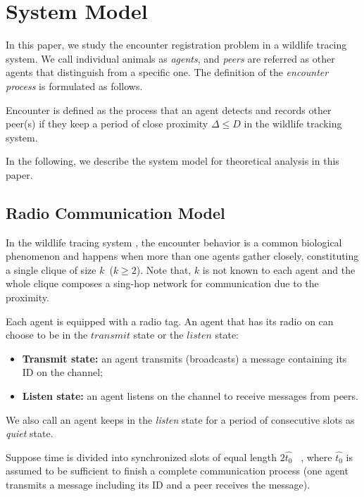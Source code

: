 \section{System Model}
\label{sectionmodel}

In this paper, we study the encounter registration problem in a wildlife 
tracing system. We call individual animals as \emph{agents}, 
and \emph{peers} are referred as other agents that distinguish from 
a specific one.
The definition of the \emph{encounter process} is formulated as follows.
\begin{definition}
Encounter is defined as the process that 
an agent detects and records other peer(s) if they keep a period of 
close proximity $\Delta \leq D$
in the wildlife tracking system. 
\end{definition}

In the following, we describe the system model for theoretical analysis in this paper.



\subsection{Radio Communication Model}


In the  wildlife tracing system {\sysname}, the encounter behavior  
is a common biological phenomenon and
happens when more than one agents gather closely, constituting a 
single clique of size $k$~($k \geq 2$).
Note that, $k$ is not known to each agent and the whole 
clique composes a sing-hop network for communication due to the proximity. 

Each agent is equipped with a radio tag. 
An agent that has its radio on can choose to be in the $transmit$ state
or the $listen$ state:
\begin{itemize}
\item \textbf{Transmit state:} an agent transmits (broadcasts) 
a message containing its ID on the channel;
\item  \textbf{Listen state:} an agent listens on 
the channel to receive messages from peers.
\end{itemize}
We also call an agent keeps in the \emph{listen} state for a period of consecutive slots 
as \emph{quiet} state.

Suppose time is divided into synchronized slots of equal 
length $2\hat{t_0}$~\cite{Xu2005Lightweight, Sivrikaya2004Time}
, where $\hat{t_0}$ is assumed to be sufficient to finish a complete
communication process (one agent transmits a message including its ID and
a peer receives the message).

